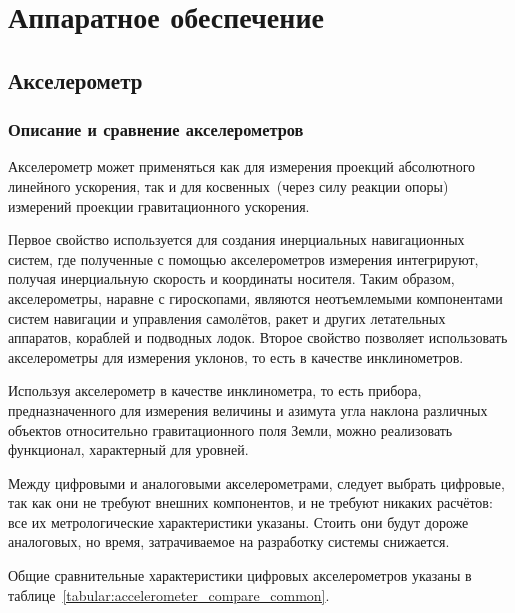 \documentclass[document.tex]{subfiles}
\begin{document}
\section{Аппаратное обеспечение}
\subsection{Акселерометр}
\subsubsection{Описание и сравнение акселерометров}
Акселерометр может применяться как для измерения проекций абсолютного линейного
ускорения, так и для косвенных~(через силу реакции опоры) измерений проекции
гравитаци\-онного ускорения.

Первое свойство используется для создания инерциальных навигационных систем, где
полученные с помощью акселерометров измерения интегрируют, получая
инерци\-альную ско\-рость и координаты носителя. Таким образом, акселерометры, наравне с
гироско\-пами, являются неотъемлемыми компонентами систем навигации и управления
самолётов, ракет и других летательных аппаратов, кораблей и подводных лодок.
Второе свойство позволяет использовать акселерометры для измерения уклонов, то
есть в качестве инклино\-метров.\cite{accelerometer_info}

Используя акселерометр в качестве инклинометра, то есть прибора,
предназначенного для измерения величины и азимута угла наклона различных
объектов относительно гравита\-ционного поля Земли, можно реализовать функционал,
характерный для уровней.

Между цифровыми и аналоговыми акселерометрами, следует выбрать цифровые, так
как они не требуют внешних компонентов, и не требуют никаких расчётов: все их
метро\-логические характеристики указаны. Стоить они будут дороже аналоговых, но
время, затра\-чиваемое на разработку системы
снижается.\cite{accelerometer_compare}

Общие сравнительные характеристики цифровых акселерометров указаны в таблице~\ref{tabular:accelerometer_compare_common}.
\end{document}
